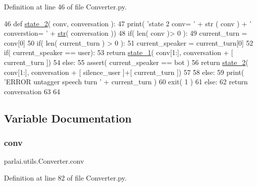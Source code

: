 Definition at line 46 of file Converter.\+py.


\begin{DoxyCode}
46 \textcolor{keyword}{def }\hyperlink{namespaceparlai_1_1utils_1_1Converter_a051af07ed1e796ee044390b710646091}{state\_2}( conv, conversation ):
47     print( \textcolor{stringliteral}{'state 2 conv= '} + str ( conv ) + \textcolor{stringliteral}{' converstion= '} + \hyperlink{namespacegenerate__task__READMEs_a5b88452ffb87b78c8c85ececebafc09f}{str}( conversation ))
48     if( len( conv )> 0 ):
49         current\_turn = conv[0]
50         if( len( current\_turn ) > 0 ):
51             current\_speaker = current\_turn[0]
52             if( current\_speaker == user):
53                 \textcolor{keywordflow}{return} \hyperlink{namespaceparlai_1_1utils_1_1Converter_a6e544c13c3304bc8e97127997e507bb3}{state\_1}( conv[1:], conversation + [ current\_turn ])
54             \textcolor{keywordflow}{else}:
55                 assert( current\_speaker == bot )
56                 \textcolor{keywordflow}{return} \hyperlink{namespaceparlai_1_1utils_1_1Converter_a051af07ed1e796ee044390b710646091}{state\_2}( conv[1:], conversation + [ silence\_user ]+[ current\_turn ])
57             
58         \textcolor{keywordflow}{else}:
59             print( \textcolor{stringliteral}{'ERROR untagger speech turn '} + current\_turn )
60             exit( 1 )
61     \textcolor{keywordflow}{else}:
62         \textcolor{keywordflow}{return} conversation
63 
64     
\end{DoxyCode}


\subsection{Variable Documentation}
\mbox{\label{namespaceparlai_1_1utils_1_1Converter_a2e942515aeaa70796cb716cd2f5be7ce}} 
\subsubsection{\texorpdfstring{conv}{conv}}
{\footnotesize\ttfamily parlai.\+utils.\+Converter.\+conv}



Definition at line 82 of file Converter.\+py.

\mbox{\label{namespaceparlai_1_1utils_1_1Converter_aac04ea3fc65825d573bf7fe3a8debae7}} 
